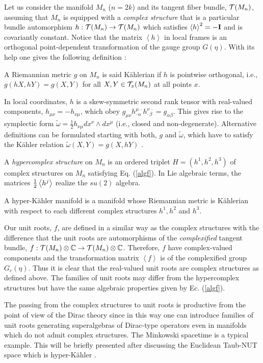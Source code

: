 \documentclass[a4paper,12pt]{article}
\begin{document}
Let us consider the manifold $M_n$ ($n=2k$) and its tangent fiber bundle, 
${\cal T}(M_{n})$,  assuming that $M_n$ is equipped with a 
{\em  complex structure} that is a particular bundle automorphism 
$h: {\cal T}(M_{n}) \to {\cal T}(M_{n})$ which satisfies 
$\left<h\right>^2=-{\bf I}$ and is covariantly constant. 
Notice that the matrix $\left<h\right>$ in local frames is an orthogonal
point-dependent transformation of the gauge group $G(\eta)$.
With its help one gives the following definition \cite{LM,GM}: 
\begin{defin} 
A Riemannian metric $g$ on $M_n$ is said K\" ahlerian if $h$ is 
pointwise orthogonal, i.e., $g(hX,hY)=g(X,Y)$ for all $X,Y\in 
{\cal T}_x(M_{n})$ at all points $x$. 
\end{defin}  
In local coordinates, $h$ is a skew-symmetric second rank tensor with 
real-valued components, $h_{\mu\nu}=-h_{\nu\mu}$, 
which obey $g_{\mu\nu}h^{\mu\,\cdot}_{\cdot\,\alpha}
h^{\nu\,\cdot}_{\cdot\,\beta}=g_{\alpha\beta}$. This gives rise to the 
symplectic form $\tilde\omega=\frac{1}{2}h_{\nu\mu}dx^{\nu}\land dx^{\mu}$ 
(i.e., closed and non-degenerate). 
Alternative definitions can be formulated starting with both, $g$ and 
$\tilde\omega$, which have to satisfy the K\" ahler relation 
$\tilde\omega(X,Y)=g(X,hY)$ \cite{GM}.    

A {\em hypercomplex structure} on $M_n$ is an ordered triplet $H = (h^1, h^2, 
h^3)$ of complex structures on $M_n$ satisfying Eq. (\ref{algf}). 
In Lie algebraic terms, the matrices ${1 \over 2} \left<h^j\right>$ realize 
the $su(2)$ algebra.
\begin{defin}
A hyper-K\" ahler manifold is a manifold whose Riemannian metric is 
K\"ahlerian with respect to each different complex structures 
$h^1, h^2$ and $h^3$. 
\end{defin}

Our unit roots, $f$, are defined in a similar way as the complex structures 
with the difference that the unit roots are automorphisms of the 
{\em complexified} tangent bundle, 
$f: {\cal T}(M_{n})\otimes{\Bbb C} \to {\cal T}(M_{n})\otimes {\Bbb C}$. 
Therefore, $f$ have complex-valued components and the transformation 
matrix $\left<f\right>$ is of the complexified group $G_{c}(\eta)$. Thus 
it is clear that the real-valued unit roots are complex structures as defined 
above. The families of unit roots may differ from the hypercomplex structures 
but have the same algebraic properties given by Ec. (\ref{algf}). 

The passing from the complex structures to unit roots is productive 
from the point of view of the Dirac theory since in this way 
one can introduce families of unit roots generating superalgebras of 
Dirac-type operators even in manifolds which do not admit complex structures.   
The Minkowski spacetime is a typical example. This will be briefly presented 
after discussing the Euclidean Taub-NUT space which is hyper-K\" ahler
\cite{AH, GR}.  
\end{document}
